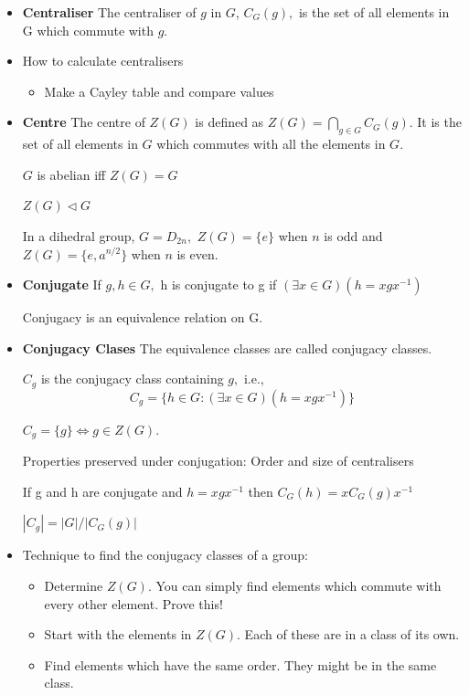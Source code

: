 \documentclass[a4paper, 12pt]
{article}
\begin{document}
\begin{itemize}
		\item \textbf{Centraliser} The centraliser of $g$ in $G$, $C_G(g),$ is the set of all elements in G which commute with $g.$ 
		
		\item How to calculate centralisers
		\begin{itemize}
			\item Make a Cayley table and compare values
		\end{itemize}
		
		
		\item \textbf{Centre} The centre of $Z(G)$ is defined as $Z(G)= \bigcap_{g \in G}C_G(g).$ It is the set of all elements in $G$ which commutes with all the elements in $G.$
		
		$G$ is abelian iff $Z(G)=G$
		
		$Z(G) \triangleleft G$
		
		In a dihedral group, $G= D_{2n},$ $Z(G)= \{e\}$ when $n$ is odd and $Z(G)= \{e, a^{n/2}\}$ when $n$ is even.
		
		\item \textbf{Conjugate} If $g,h \in G,$ h is conjugate to g if $(\exists x \in G)(h=xgx^{-1})$
		
		Conjugacy is an equivalence relation on G. 
		
		\item \textbf{Conjugacy Clases} The equivalence classes are called conjugacy classes. 
		
		$C_g$ is the conjugacy class containing $g,$ i.e., $$C_g = \{h \in G: (\exists x \in G)( h= xgx^{-1})\}$$
		
		$C_g =\{g\} \iff g \in Z(G).$
		
		Properties preserved under conjugation:
		Order and size of centralisers
		
		If g and h are conjugate and $h= xgx^{-1}$ then $C_G(h)= xC_G(g)x^{-1}$
		
		$|C_g| = |G| / |C_G(g)|$
		
		\item Technique to find the conjugacy classes of a group:
		\begin{itemize}
			\item  Determine $Z(G).$ You can simply find elements which commute with every other element. Prove this!
			
			\item 	Start with the elements in $Z(G).$ Each of these are in a class of its own.
			
			\item Find elements which have the same order. They might be in the same class. 
			

\end{itemize}
\end{itemize}
\end{document}
